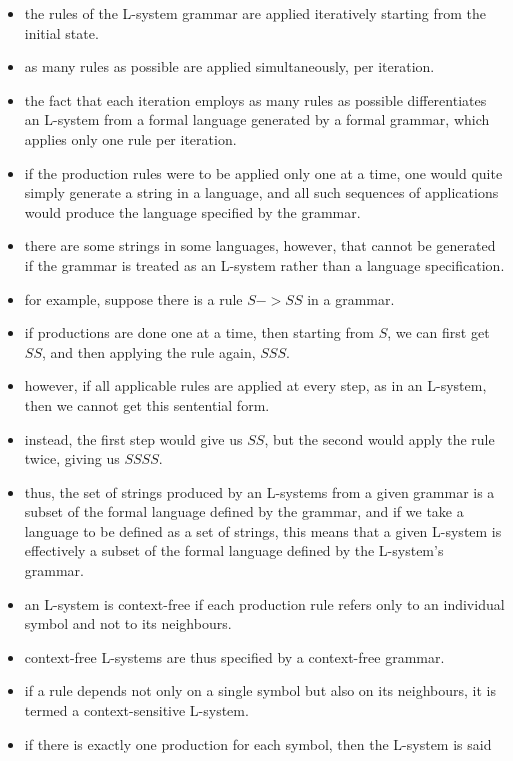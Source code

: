 \documentclass[11pt]{report}
\begin{document}
\begin{itemize}
    \item the rules of the L-system grammar are applied iteratively starting from the
          initial state.
    \item as many rules as possible are applied simultaneously, per iteration.
    \item the fact that each iteration employs as many rules as possible differentiates
          an L-system from a formal language generated by a formal grammar, which applies
          only one rule per iteration.
    \item if the production rules were to be applied only one at a time, one would quite
          simply generate a string in a language, and all such sequences of applications
          would produce the language specified by the grammar.
    \item there are some strings in some languages, however, that cannot be generated if
          the grammar is treated as an L-system rather than a language specification.
    \item for example, suppose there is a rule $S->SS$ in a grammar.
    \item if productions are done one at a time, then starting from $S$, we can first get
          $SS$, and then applying the rule again, $SSS$.
    \item however, if all applicable rules are applied at every step, as in an L-system,
          then we cannot get this sentential form.
    \item instead, the first step would give us $SS$, but the second would apply the rule
          twice, giving us $SSSS$.
    \item thus, the set of strings produced by an L-systems from a given grammar is a
          subset of the formal language defined by the grammar, and if we take a language
          to be defined as a set of strings, this means that a given L-system is
          effectively a subset of the formal language defined by the L-system's grammar.
    \item an L-system is context-free if each production rule refers only to an
          individual symbol and not to its neighbours.
    \item context-free L-systems are thus specified by a context-free grammar.
    \item if a rule depends not only on a single symbol but also on its neighbours, it is
          termed a context-sensitive L-system.
    \item if there is exactly one production for each symbol, then the L-system is said

\end{itemize}
\end{document}
